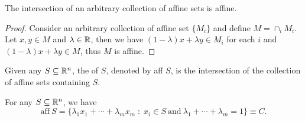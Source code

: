 \documentclass[11pt,a4paper]{article}
\begin{document}

\begin{lemma}\label{lem:intersection_affine_sets}
    The intersection of an arbitrary collection of affine sets is affine.
\end{lemma}

\begin{proof}
    Consider an arbitrary collection of affine set $\{M_i\}$ and define $M = \cap_i M_i$. Let $x,y\in M$ and $\lambda \in \mathbb{R}$, then we have $(1-\lambda)x + \lambda y\in M_i$ for each $i$ and $(1-\lambda)x + \lambda y\in M$, thus $M$ is affine.
\end{proof}

\begin{definition}
    Given any $S\subseteq \mathbb{R}^n$, the  of $S$, denoted by aff $S$, is the intersection of the collection of affine sets containing $S$.
\end{definition}

\begin{proposition}\label{prop:affine_hull_affine_comb}
    For any $S\subseteq \mathbb{R}^n$, we have 
    \begin{equation*}
        \mathrm{aff}\ S = \{ \lambda_1 x_1 + \cdots + \lambda_m x_m \;:\; x_i\in S \ \text{and}\ \lambda_1+\cdots+\lambda_m = 1 \}\equiv C.
    \end{equation*}
\end{proposition}
\end{document}
